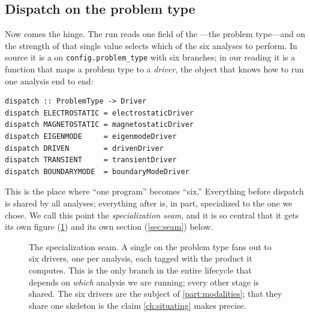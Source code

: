 \subsection{Dispatch on the problem type}

Now comes the hinge. The run reads one field of the ---the problem
type---and on the strength of that single value selects which of the six
analyses to perform. In source it is a  on
\lstinline[style=l4style]|config.problem_type| with six branches; in our reading
it is a function that maps a problem type to a \emph{driver}, the object that
knows how to run one analysis end to end:
\begin{lstlisting}[style=l4style]
dispatch :: ProblemType -> Driver
dispatch ELECTROSTATIC = electrostaticDriver
dispatch MAGNETOSTATIC = magnetostaticDriver
dispatch EIGENMODE     = eigenmodeDriver
dispatch DRIVEN        = drivenDriver
dispatch TRANSIENT     = transientDriver
dispatch BOUNDARYMODE  = boundaryModeDriver
\end{lstlisting}

This is the place where ``one program'' becomes ``six.'' Everything before
dispatch is shared by all analyses; everything after is, in part, specialized to
the one we chose. We call this point the \emph{specialization seam}, and it is so
central that it gets its own figure (\cref{fig:dispatch}) and its own section
(\cref{sec:seam}) below.

\begin{figure}[t]
\centering
{}
\caption[The dispatch fan-out]{The specialization seam. A single
 on the problem type fans out to six drivers, one per analysis,
each tagged with the product it computes. This is the only branch in the entire
lifecycle that depends on \emph{which} analysis we are running; every other stage
is shared. The six drivers are the subject of \cref{part:modalities}; that they
share one skeleton is the claim \cref{ch:situating} makes precise.}
\label{fig:dispatch}
\end{figure}

